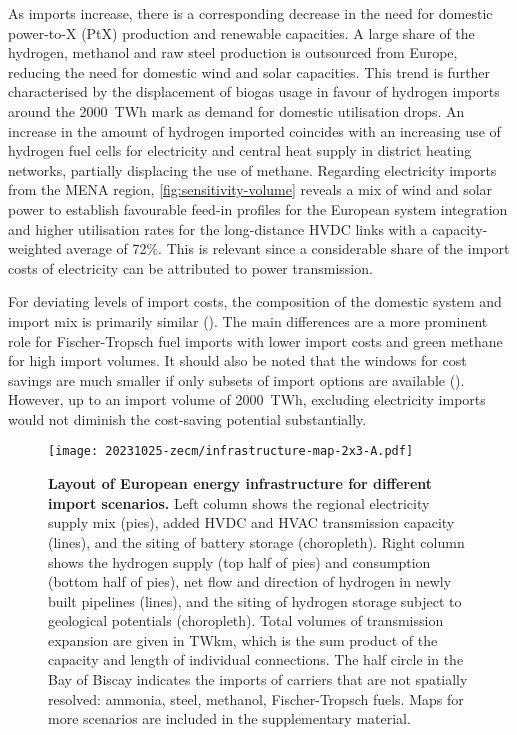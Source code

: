 As imports increase, there is a corresponding decrease in the need for domestic
power-to-X (PtX) production and renewable capacities. A large share of the
hydrogen, methanol and raw steel production is outsourced from Europe, reducing
the need for domestic wind and solar capacities. This trend is further
characterised by the displacement of biogas usage in favour of hydrogen imports
around the 2000~TWh mark as demand for domestic  utilisation drops. An
increase in the amount of hydrogen imported coincides with an increasing use of
hydrogen fuel cells for electricity and central heat supply in district heating
networks, partially displacing the use of methane. Regarding electricity imports
from the MENA region, \cref{fig:sensitivity-volume} reveals a mix of wind and
solar power to establish favourable feed-in profiles for the European system
integration and higher utilisation rates for the long-distance HVDC links with a
capacity-weighted average of 72\%. This is relevant since a considerable share
of the import costs of electricity can be attributed to power transmission.


For deviating levels of import costs, the composition of the domestic system and
import mix is primarily similar (). The main differences
are a more prominent role for Fischer-Tropsch fuel imports with lower import
costs and green methane for high import volumes. It should also be noted that
the windows for cost savings are much smaller if only subsets of import options
are available (). However, up to an import volume
of 2000~TWh, excluding electricity imports would not diminish the cost-saving
potential substantially.

\begin{figure*}
    \texttt{[image: 20231025-zecm/infrastructure-map-2x3-A.pdf]}
    \caption{\textbf{Layout of European energy infrastructure for different import scenarios.}
        Left column shows the regional electricity supply mix (pies), added HVDC
        and HVAC transmission capacity (lines), and the siting of battery
        storage (choropleth). Right column shows the hydrogen supply (top half
        of pies) and consumption (bottom half of pies), net flow and direction
        of hydrogen in newly built pipelines (lines), and the siting of hydrogen
        storage subject to geological potentials (choropleth). Total volumes of
        transmission expansion are given in TWkm, which is the sum product of
        the capacity and length of individual connections. The half circle in
        the Bay of Biscay indicates the imports of carriers that are not
        spatially resolved: ammonia, steel, methanol, Fischer-Tropsch fuels.
        Maps for more scenarios are included in the supplementary material. }
    \label{fig:import-infrastructure}
\end{figure*}

